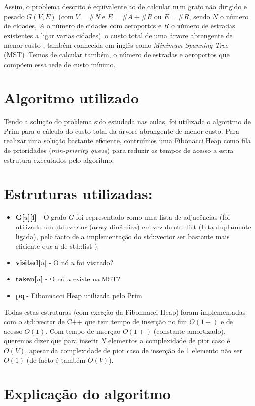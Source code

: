 \documentclass{scrartcl}
\begin{document}
Assim, o problema descrito é equivalente ao de calcular num grafo não dirigido e pesado $G(V,E)$ (com $V = \#N$ e $E = \#A+\#R$ ou $E = \#R$, sendo $N$ o número de cidades, $A$ o número de cidades com aeroportos e $R$ o número de estradas existentes a ligar varias cidades), o custo total de uma árvore abrangente de menor custo , também conhecida em inglês como \textit{Minimum Spanning Tree} (MST). Temos de calcular também, o número de estradas e aeroportos que compõem essa rede de custo mínimo.

\section*{Algoritmo utilizado}
Tendo a solução do problema sido estudada nas aulas, foi utilizado o algoritmo de Prim para o cálculo do custo total da árvore abrangente de menor custo. \cite{prim} Para realizar uma solução bastante eficiente, contruímos uma Fibonacci Heap como fila de prioridades (\textit{min-priority queue}) para reduzir os tempos de acesso a estra estrutura executados pelo algoritmo. \cite{tarjan}

\section*{Estruturas utilizadas:}
\begin{itemize}
\setlength\itemsep{-0.5ex}
\item \textbf{G[$u$][i]} - O grafo $G$ foi representado como uma lista de adjacências (foi utilizado um std::vector (array dinâmica) em vez de std::list (lista duplamente ligada), pelo facto de a implementação do std::vector ser bastante mais eficiente que a de std::list \cite{ISOC++:2003}).
\item \textbf{visited[$u$]} - O nó $u$ foi visitado?
\item \textbf{taken[$u$]} - O nó $u$ existe na MST?
\item \textbf{pq} - Fibonnacci Heap utilizada pelo Prim
\end{itemize}
Todas estas estruturas (com exceção da Fibonnacci Heap) foram implementadas com o std::vector de C++ que tem tempo de inserção no fim $O(1+)$ e de acesso $O(1)$. Com tempo de inserção $O(1+)$ (constante amortizado), queremos dizer que para inserir $N$ elementos a complexidade de pior caso é $O(V)$, apesar da complexidade de pior caso de inserção de 1 elemento não ser $O(1)$ (de facto é também $O(V)$). \cite{ISOC++:2003}

\section*{Explicação do algoritmo}
\end{document}
